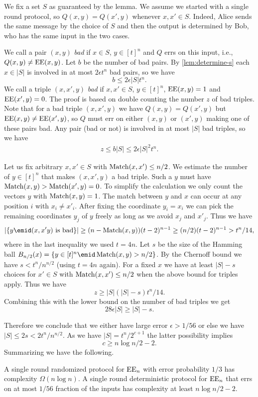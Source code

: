 We fix a set $S$ as guaranteed by the lemma. We assume we
started with a single round protocol, so $Q(x,y)=Q(x',y)$
whenever $x,x'\in S$. Indeed, Alice sends the same message by
the choice of $S$ and then the output is determined by Bob, who
has the same input in the two cases.

We call a pair $(x,y)$ {\em bad} if $x\in S$, $y\in[t]^n$ and
$Q$ errs on this input, i.e., $Q(x,y)\ne\operatorname{EE}(x,y)$. Let $b$ be
the number of bad pairs. By \autoref{lem:determine-s} each
$x\in|S|$ is involved in at most $2\epsilon t^n$ bad pairs, so
we have $$b\le2\epsilon|S|t^n.$$
%
We call a triple $(x,x',y)$ {\em bad} if $x,x'\in S$,
$y\in[t]^n$, $\operatorname{EE}(x,y)=1$ and $\operatorname{EE}(x',y)=0$. The proof is based
on double counting the number $z$ of bad triples.
%
Note that for a bad triple $(x,x',y)$ we have $Q(x,y)=Q(x',y)$
but $\operatorname{EE}(x,y)\ne\operatorname{EE}(x',y)$, so $Q$ must err on either $(x,y)$ or
$(x',y)$ making one of these pairs bad. Any pair (bad or not) is
involved in at most $|S|$ bad triples, so we have
\begin{align*}
z\le b|S|\le2\epsilon|S|^2t^n.
\end{align*}

Let us fix arbitrary $x,x'\in S$ with $\operatorname{Match}(x,x')\le n/2$. We
estimate the number of $y\in[t]^n$ that makes $(x,x',y)$ a bad
triple. Such a $y$ must have $\operatorname{Match}(x,y)>\operatorname{Match}(x',y)=0$. To
simplify the calculation we only count the vectors $y$ with
$\operatorname{Match}(x,y)=1$. The match between $y$ and $x$ can occur at any
position $i$ with $x_i\ne x'_i$. After fixing the coordinate
$y_i=x_i$ we can pick the remaining coordinates $y_j$ of $y$
freely as long as we avoid $x_j$ and $x'_j$. Thus we have
\begin{align*}
|\{y\emid(x,x'y)\hbox{ is bad}\}|\ge
(n-\Match(x,y))(t-2)^{n-1}\ge(n/2)(t-2)^{n-1}>t^n/14,
\end{align*}
where in the last inequality we used $t=4n$. Let $s$ be the size
of the Hamming ball
$B_{n/2}(x)=\{y\in[t]^n\emid\Match(x,y)>n/2\}$. By the Chernoff
bound we have $s<t^n/n^{n/2}$ (using $t=4n$ again). For a fixed
$x$ we have at least $|S|-s$ choices for $x'\in S$ with
$\operatorname{Match}(x,x')\le n/2$ when the above bound for triples apply.
Thus we have $$z\ge|S|(|S|-s)t^n/14.$$ Combining this with the
lower bound on the number of bad triples we get
$$28\epsilon|S|\ge|S|-s.$$

Therefore we conclude that we either have large error
$\epsilon>1/56$ or else we have $|S|\le2s<2t^n/n^{n/2}$. As we
have $|S|=t^n/2^{c+1}$ the latter possibility implies 
$$c\ge n\log n/2-2.$$ Summarizing we have the following.

\begin{theorem} \label{thm:singleround} A single round
randomized protocol for $\operatorname{EE}_n$ with error probability $1/3$
has complexity $\Omega(n\log n)$.
A single round deterministic protocol for $\operatorname{EE}_n$ that errs on
at most $1/56$ fraction of the inputs has complexity at least
$n\log n/2-2$.
\end{theorem}